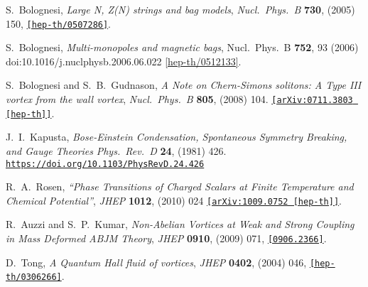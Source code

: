\documentclass[12pt,a4paper]{article}
\begin{document}
\begin{thebibliography}{99}
  S.~Bolognesi,
  {\it Large N, Z(N) strings and bag models},
  {\it Nucl.\ Phys.\ B} {\bf 730}, (2005) 150, 
 \href{https://arxiv.org/abs/hep-th/0507286}{\tt [hep-th/0507286]}.

  S.~Bolognesi,
  {\it Multi-monopoles and magnetic bags},
  Nucl.\ Phys.\ B {\bf 752}, 93 (2006)
  doi:10.1016/j.nuclphysb.2006.06.022
  \href{https://arxiv.org/abs/hep-th/0512133}{[hep-th/0512133]}.

  S.~Bolognesi and S.~B.~Gudnason,
  {\it A Note on Chern-Simons solitons: A Type III vortex from the wall vortex},
  {\it Nucl.\ Phys.\ B} {\bf 805}, (2008) 104.
  \href{https://arxiv.org/abs/0711.3803}{\tt [arXiv:0711.3803 [hep-th]]}.

 
  
  J.~I.~Kapusta,
  {\it Bose-Einstein Condensation, Spontaneous Symmetry Breaking, and Gauge Theories}
  {\it Phys.\ Rev.\ D} {\bf 24}, (1981) 426.
  \href{https://doi.org/10.1103/PhysRevD.24.426}{\tt https://doi.org/10.1103/PhysRevD.24.426}
 
 R.~A.~Rosen,
 {\it ``Phase Transitions of Charged Scalars at Finite Temperature and Chemical Potential''},
 {\it JHEP} {\bf 1012}, (2010) 024 
\href{https://arxiv.org/abs/1009.0752}{\tt [arXiv:1009.0752 [hep-th]]}.

  R.~Auzzi and S.~P.~Kumar,
  {\it Non-Abelian Vortices at Weak and Strong Coupling in Mass Deformed ABJM Theory}, 
  {\it JHEP} {\bf 0910}, (2009) 071,
 \href{https://arxiv.org/abs/0906.2366}{\tt[0906.2366]}.


  D.~Tong,
  {\it A Quantum Hall fluid of vortices},
  {\it JHEP} {\bf 0402}, (2004) 046, 
  \href{https://arxiv.org/abs/hep-th/0306266}{\tt[hep-th/0306266]}.
  
  
   
   
  


 \end{thebibliography}
\end{document}
